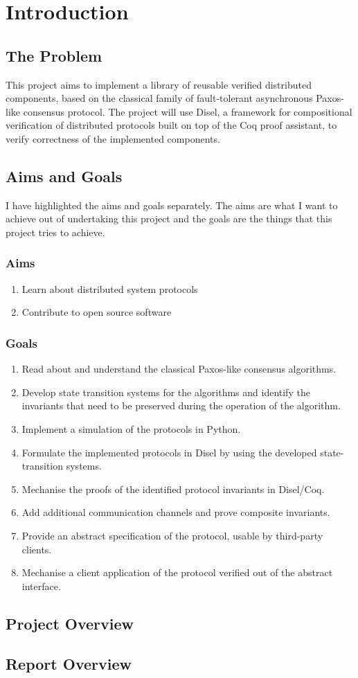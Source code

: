 \chapter{Introduction}

\section{The Problem}
This project aims to implement a library of reusable verified distributed components,
based on the classical family of fault-tolerant asynchronous Paxos-like consensus protocol.
The project will use Disel, a framework for compositional verification of distributed
protocols built on top of the Coq proof assistant, to verify correctness of the
implemented components.

\section{Aims and Goals}
I have highlighted the aims and goals separately. The aims are what I want to
achieve out of undertaking this project and the goals are the things that this
project tries to achieve.

\subsection{Aims}
\begin{enumerate}
\itemsep0em
  \item Learn about distributed system protocols
  \item Contribute to open source software
\end{enumerate}

\vspace{-5mm}
\subsection{Goals}
\begin{enumerate}
\itemsep0em 
  \item Read about and understand the classical Paxos-like consensus algorithms.
  \item Develop state transition systems for the algorithms and identify the invariants that need to be preserved during the operation of the algorithm.
  \item Implement a simulation of the protocols in Python.
  \item Formulate the implemented protocols in Disel by using the developed state-transition systems.
  \item Mechanise the proofs of the identified protocol invariants in Disel/Coq.
  \item Add additional communication channels and prove composite invariants.
  \item Provide an abstract specification of the protocol, usable by third-party clients.
  \item Mechanise a client application of the protocol verified out of the abstract interface.
\end{enumerate}

\vspace{-4mm}
\section{Project Overview}

\section{Report Overview}
